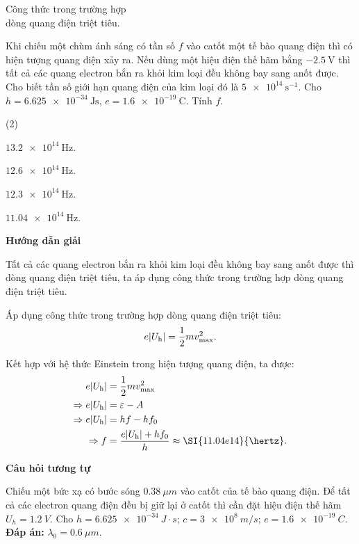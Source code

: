 \begin{dang}{Công thức trong trường hợp\\ dòng quang điện triệt tiêu.}


{Khi chiếu một chùm ánh sáng có tần số $f$ vào catốt một tế bào quang điện thì có hiện tượng quang điện xảy ra. Nếu dùng một hiệu điện thế hãm bằng $\SI{-2.5}{\volt}$ thì tất cả các quang electron bắn ra khỏi kim loại đều không bay sang anốt được. Cho biết tần số giới hạn quang điện của kim loại đó là $\SI{5e14}{\second ^ {-1}}$. Cho $h=\SI{6.625e-34}{\joule \second}$, $e=\SI{1.6e-19}{\coulomb}$. Tính $f$.
\begin{mcq}(2)
	\item $\SI{13.2e14}{\hertz}$.
	\item $\SI{12.6e14}{\hertz}$.
	\item $\SI{12.3e14}{\hertz}$.
	\item $\SI{11.04e14}{\hertz}$.
\end{mcq}
}{\begin{center}
	\textbf{Hướng dẫn giải}
\end{center}

Tất cả các quang electron bắn ra khỏi kim loại đều không bay sang anốt được thì dòng quang điện triệt tiêu, ta áp dụng công thức trong trường hợp dòng quang điện triệt tiêu.

Áp dụng công thức trong trường hợp dòng quang điện triệt tiêu:
\begin{equation*}
	e |U_\text h|=\dfrac{1}{2}mv_\text{max}^2.
\end{equation*}

Kết hợp với hệ thức Einstein trong hiện tượng quang điện, ta được:
\begin{align*}
	e |U_\text h|&=\dfrac{1}{2}mv_\text{max}^2 \\
	\Rightarrow e |U_\text h|&= \varepsilon - A \\
	\Rightarrow e |U_\text h|&=hf-hf_0 \\
	\Rightarrow f &= \dfrac{e |U_\text h| + hf_0}{h}\approx \SI{11.04e14}{\hertz}.
\end{align*}

\begin{center}
	\textbf{Câu hỏi tương tự}
\end{center}

Chiếu một bức xạ có bước sóng $ \SI{0,38}{\mu m} $ vào catốt của tế bào quang điện. Để tất cả các electron quang điện đều bị giữ lại ở catốt thì cần đặt hiệu điện thế hãm $ U_{h} = \SI{1,2}{V} $. Cho $ h = \SI{6,625 e-34}{J \cdot s} $; $ c = \SI{3 e8}{m/s} $; $ e = \SI{1,6 e-19}{C} $. \\

\textbf{Đáp án:} $ \lambda_{0} = \SI{0,6}{\mu m} $.
}

\end{dang}